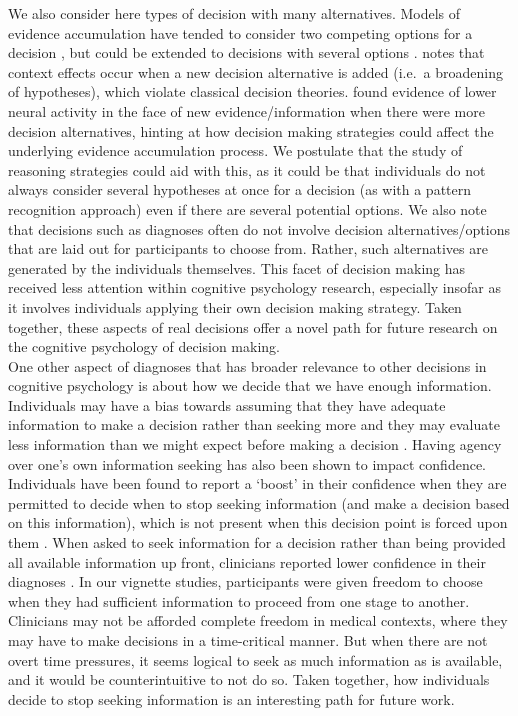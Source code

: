 \documentclass[a4paper, nobind]{templates/ociamthesis}
\begin{document}
We also consider here types of decision with many alternatives. Models of evidence accumulation have tended to consider two competing options for a decision \autocite{mcmillen_dynamics_2006}, but could be extended to decisions with several options \autocite{brown_observing_2009}. \textcite{trueblood2022} notes that context effects occur when a new decision alternative is added (i.e.~a broadening of hypotheses), which violate classical decision theories. \textcite{churchland2012} found evidence of lower neural activity in the face of new evidence/information when there were more decision alternatives, hinting at how decision making strategies could affect the underlying evidence accumulation process. We postulate that the study of reasoning strategies could aid with this, as it could be that individuals do not always consider several hypotheses at once for a decision (as with a pattern recognition approach) even if there are several potential options. We also note that decisions such as diagnoses often do not involve decision alternatives/options that are laid out for participants to choose from. Rather, such alternatives are generated by the individuals themselves. This facet of decision making has received less attention within cognitive psychology research, especially insofar as it involves individuals applying their own decision making strategy. Taken together, these aspects of real decisions offer a novel path for future research on the cognitive psychology of decision making.\\

One other aspect of diagnoses that has broader relevance to other decisions in cognitive psychology is about how we decide that we have enough information. Individuals may have a bias towards assuming that they have adequate information to make a decision rather than seeking more \autocite{gehlbach_illusion_2024} and they may evaluate less information than we might expect before making a decision \autocite{klein_people_2018}. Having agency over one's own information seeking has also been shown to impact confidence. Individuals have been found to report a `boost' in their confidence when they are permitted to decide when to stop seeking information (and make a decision based on this information), which is not present when this decision point is forced upon them \autocite{wei_confidence_2021}. When asked to seek information for a decision rather than being provided all available information up front, clinicians reported lower confidence in their diagnoses \autocite{gruppen_information_1991}. In our vignette studies, participants were given freedom to choose when they had sufficient information to proceed from one stage to another. Clinicians may not be afforded complete freedom in medical contexts, where they may have to make decisions in a time-critical manner. But when there are not overt time pressures, it seems logical to seek as much information as is available, and it would be counterintuitive to not do so. Taken together, how individuals decide to stop seeking information is an interesting path for future work.\\
\end{document}
